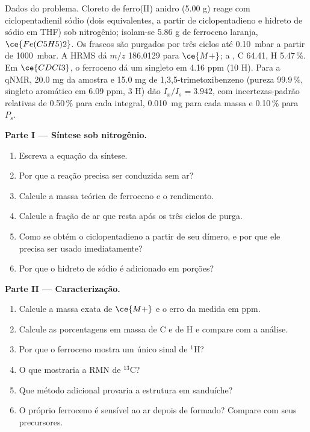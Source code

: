 \begin{problem}
\label{pb:b3:lab-techniques-3:1}
Dados do problema. Cloreto de ferro(II) anidro (5.00 g) reage com ciclopentadienil
sódio (dois equivalentes, a partir de ciclopentadieno e hidreto de sódio em
THF) sob nitrogênio; isolam-se 5.86 g de ferroceno laranja, $\ce{Fe(C5H5)2}$. Os frascos são
purgados por três ciclos até \qty{0.10}{mbar} a partir de \qty{1000}{mbar}. A HRMS dá $m/z$ 186.0129 para $\ce{M+}$; a , C 64.41, H 5.47\,\%. Em $\ce{CDCl3}$, o ferroceno dá um singleto em 4.16 ppm (10 H). Para a qNMR,
20.0 mg da amostra e 15.0 mg de 1,3,5-trimetoxibenzeno (pureza 99.9\,\%, singleto
aromático em 6.09 ppm, 3 H) dão $I_x/I_s = 3.942$, com incertezas-padrão relativas de 0.50\,\% para cada
integral, \qty{0.010}{mg} para cada massa e 0.10\,\% para $P_s$.

\medskip\noindent\textbf{Parte I --- Síntese sob nitrogênio.}
\begin{enumerate}
  \item Escreva a equação da síntese.
  \item Por que a reação precisa ser conduzida sem ar?
  \item Calcule a massa teórica de ferroceno e o rendimento.
  \item Calcule a fração de ar que resta após os três ciclos de purga.
  \item Como se obtém o ciclopentadieno a partir de seu dímero, e por que ele precisa ser usado imediatamente?
  \item Por que o hidreto de sódio é adicionado em porções?
\end{enumerate}

\medskip\noindent\textbf{Parte II --- Caracterização.}
\begin{enumerate}[resume]
  \item Calcule a massa exata de $\ce{M+}$ e o erro da medida em ppm.
  \item Calcule as porcentagens em massa de C e de H e compare com a análise.
  \item Por que o ferroceno mostra um único sinal de $^1$H?
  \item O que mostraria a RMN de $^{13}$C?
  \item Que método adicional provaria a estrutura em sanduíche?
  \item O próprio ferroceno é sensível ao ar depois de formado? Compare com seus precursores.
\end{enumerate}


\end{problem}
